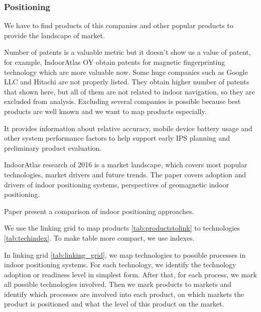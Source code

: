 \subsubsection{Positioning}

We have to find products of this companies and other popular products to provide the landscape of market.


Number of patents is a valuable metric but it doesn't show us a value of patent, for example, IndoorAtlas OY obtain patents for magnetic fingerprinting technology which are more valuable now. Some huge companies such as Google LLC and Hitachi are not properly listed. They obtain higher number of patents that shown here, but all of them are not related to indoor navigation, so they are excluded from analysis. Excluding several companies is possible because best products are well known and we want to map products especially.

\cite{Security} It provides information about relative accuracy, mobile device battery usage and other system performance factors to help support early IPS planning and preliminary product evaluation.

\cite{Mautz2012IndoorPT}

IndoorAtlas research of 2016\cite{IPTrise} is a market landscape, which covers most popular technologies, market drivers and future trends. The paper covers adoption and drivers of indoor positioning systems, perspectives of geomagnetic indoor positioning.

Paper \cite{Brena2017} present a comparison of indoor positioning approaches.







We use the linking grid to map products \ref{tab:productstolink} to technologies \ref{tab:techindex}. To make table more compact, we use indexes.



In linking grid \ref{tab:linking_grid}, we map technologies to possible processes in indoor positioning systems. For each technology, we identify the technology adoption or readiness level in simplest form. After that, for each process, we mark all possible technologies involved. Then we mark products to markets and identify which processes are involved into each product, on which markets the product is positioned and what the level of this product on the market.


